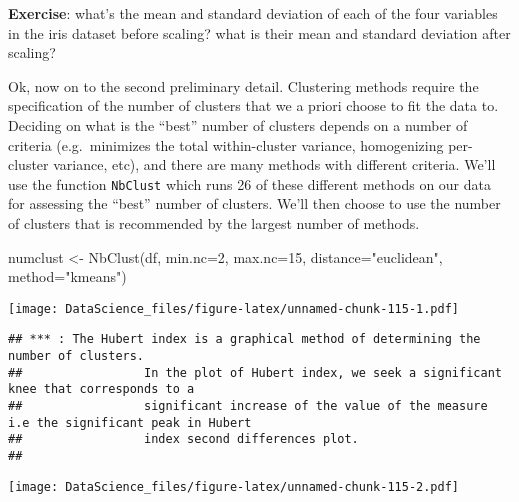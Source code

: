 \documentclass[
]{book}
\newenvironment{Shaded}{\begin{snugshade}}{\end{snugshade}}
\newcommand{\AttributeTok}[1]{\textcolor[rgb]{0.77,0.63,0.00}{#1}}
\newcommand{\DecValTok}[1]{\textcolor[rgb]{0.00,0.00,0.81}{#1}}
\newcommand{\FunctionTok}[1]{\textcolor[rgb]{0.00,0.00,0.00}{#1}}
\newcommand{\NormalTok}[1]{#1}
\newcommand{\OtherTok}[1]{\textcolor[rgb]{0.56,0.35,0.01}{#1}}
\newcommand{\StringTok}[1]{\textcolor[rgb]{0.31,0.60,0.02}{#1}}
\begin{document}
\textbf{Exercise}: what's the mean and standard deviation of each of the four variables in the iris dataset before scaling? what is their mean and standard deviation after scaling?

Ok, now on to the second preliminary detail. Clustering methods require the specification of the number of clusters that we a priori choose to fit the data to. Deciding on what is the ``best'' number of clusters depends on a number of criteria (e.g.~minimizes the total within-cluster variance, homogenizing per-cluster variance, etc), and there are many methods with different criteria. We'll use the function \texttt{NbClust} which runs 26 of these different methods on our data for assessing the ``best'' number of clusters. We'll then choose to use the number of clusters that is recommended by the largest number of methods.

\begin{Shaded}
\begin{Highlighting}[]
\NormalTok{numclust }\OtherTok{\textless{}{-}} \FunctionTok{NbClust}\NormalTok{(df, }\AttributeTok{min.nc=}\DecValTok{2}\NormalTok{, }\AttributeTok{max.nc=}\DecValTok{15}\NormalTok{, }\AttributeTok{distance=}\StringTok{"euclidean"}\NormalTok{, }\AttributeTok{method=}\StringTok{"kmeans"}\NormalTok{)}
\end{Highlighting}
\end{Shaded}

\texttt{[image: DataScience\_files/figure-latex/unnamed-chunk-115-1.pdf]}

\begin{verbatim}
## *** : The Hubert index is a graphical method of determining the number of clusters.
##                 In the plot of Hubert index, we seek a significant knee that corresponds to a 
##                 significant increase of the value of the measure i.e the significant peak in Hubert
##                 index second differences plot. 
## 
\end{verbatim}

\texttt{[image: DataScience\_files/figure-latex/unnamed-chunk-115-2.pdf]}
\end{document}
